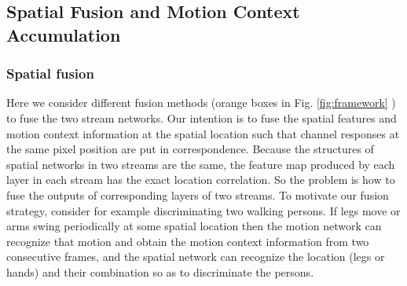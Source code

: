 \documentclass[journal]{IEEEtran}
\begin{document}


\subsection{Spatial Fusion and Motion Context Accumulation}

\subsubsection{Spatial fusion}\label{sp_fuse}

Here we consider different fusion methods (orange boxes in Fig. \ref{fig:framework} ) to fuse the two stream networks. Our intention is to fuse the spatial features and motion context information at the spatial location  such that channel responses at the same pixel position are put in correspondence. Because the structures of spatial networks in two streams are the same, the feature map produced by each layer in each stream has the exact location correlation. So the problem is how to fuse the outputs of corresponding layers of two streams. To motivate our fusion strategy, consider for example discriminating two walking persons. If legs move or arms swing periodically at some spatial location then the motion network can recognize that motion and obtain the motion context information from two consecutive frames, and the spatial network can recognize the location (legs or hands) and their combination so as to discriminate the persons.
\end{document}
